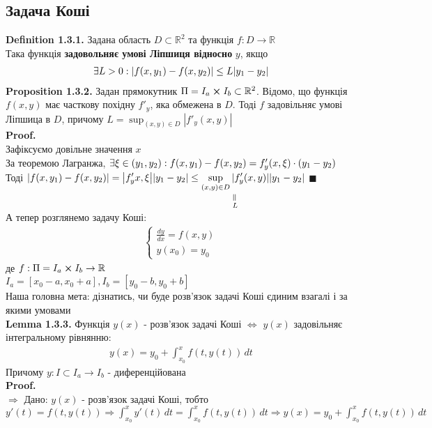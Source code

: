 \documentclass[a4paper, 14pt]{extarticle}
\def\huge{\displaystyle}
\def\defin#1{\textbf{Definition {#1}}}
\def\prp#1{\textbf{Proposition {#1}}}
\def\lm#1{\textbf{Lemma {#1}}}
\def\proof{\textbf{Proof.}\\}
\def\bigline{\vspace{5mm}\\}
\def\qed{$\blacksquare$}
\begin{document}
	\subsection{Задача Коші}
	\defin{1.3.1.} Задана область $D \subset \mathbb{R}^2$ та функція $f: D \rightarrow \mathbb{R}$\\
	Така функція \textbf{задовольняє умові Ліпшиця відносно} $y$, якщо
	\begin{align*}
	\exists L>0: \abs{f(x,y_1) - f(x,y_2)} \leq L\abs{y_1-y_2}
	\end{align*}
	\prp{1.3.2.} Задан прямокутник $\Pi = I_a \cross I_b \subset \mathbb{R}^2$. Відомо, що функція $f(x,y)$ має часткову похідну $f'_y$, яка обмежена в $D$. Тоді $f$ задовільняє умові Ліпшица в $D$, причому $\huge L = \sup_{(x,y) \in D} |f'_y(x,y)|$\\
	\proof
	Зафіксуємо довільне значення $x$\\
	За теоремою Лагранжа, $\exists \xi \in (y_1, y_2):\\f(x,y_1) - f(x,y_2) = f'_y(x, \xi)\cdot(y_1-y_2)$\\
	Тоді $\huge \abs{f(x,y_1) - f(x,y_2)} = \abs{f'_y{x, \xi}} \abs{y_1 - y_2} \leq \underset{\displaystyle \underset{L}{\rotatebox[origin=c]{90}{=}}}{\sup_{(x,y) \in D} |f'_y(x,y)|} \abs{y_1-y_2}$ \qed
	\bigline
	А тепер розглянемо задачу Коші:
	\begin{align*}
	\begin{cases}
	\displaystyle \frac{dy}{dx}=f(x,y)\\
	y(x_0)=y_0
	\end{cases}
	\end{align*}
	де $f: \Pi = I_a \cross I_b \rightarrow \mathbb{R}$\\
	$I_a = [x_0-a, x_0+a], I_b = [y_0-b, y_0+b]$\\
	Наша головна мета: дізнатись, чи буде розв'язок задачі Коші єдиним взагалі і за якими умовами
	\bigline
	\lm{1.3.3.} Функція $y(x)$ - розв'язок задачі Коші $\iff$ $y(x)$ задовільняє інтегральному рівнянню:
	\begin{align*}
	y(x) = y_0 + \int_{x_0}^x f(t,y(t))\,dt
	\end{align*}
	Причому $y: I \subset I_a \rightarrow I_b$ - диференційована\\
	\proof
	$\boxed{\Rightarrow}$ Дано: $y(x)$ - розв'язок задачі Коші, тобто\\
	$\huge y'(t) = f(t,y(t)) \Rightarrow \int_{x_0}^x y'(t)\,dt = \int_{x_0}^x f(t,y(t))\,dt \Rightarrow y(x) = y_0 +  \int_{x_0}^x f(t,y(t))\,dt$
	\\
\end{document}

